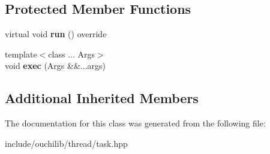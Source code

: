 \subsection*{Protected Member Functions}
\begin{DoxyCompactItemize}
\item 
\mbox{\label{classouchi_1_1task_1_1task_a600f8566c9292efe9152c4c0480aee78}} 
virtual void {\bfseries run} () override
\item 
\mbox{\label{classouchi_1_1task_1_1task_ae558545cc5f85fabd7aae62ef6294c82}} 
{\footnotesize template$<$class ... Args$>$ }\\void {\bfseries exec} (Args \&\&...args)
\end{DoxyCompactItemize}
\subsection*{Additional Inherited Members}


The documentation for this class was generated from the following file\+:\begin{DoxyCompactItemize}
\item 
include/ouchilib/thread/task.\+hpp\end{DoxyCompactItemize}
